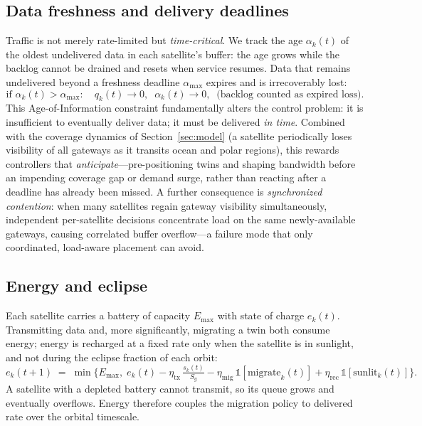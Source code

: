 \documentclass[11pt]{article}
\begin{document}
\subsection{Data freshness and delivery deadlines}
Traffic is not merely rate-limited but \emph{time-critical}. We track the age
$\alpha_k(t)$ of the oldest undelivered data in each satellite's buffer: the age
grows while the backlog cannot be drained and resets when service resumes. Data
that remains undelivered beyond a freshness deadline $\alpha_{\max}$ expires and is
irrecoverably lost:
\begin{equation}
  \text{if } \alpha_k(t) > \alpha_{\max}: \quad
  q_k(t) \rightarrow 0, \;\; \alpha_k(t) \rightarrow 0, \;\;
  \text{(backlog counted as expired loss)}.
  \label{eq:deadline}
\end{equation}
This Age-of-Information constraint fundamentally alters the control problem: it is
insufficient to eventually deliver data; it must be delivered \emph{in time}.
Combined with the coverage dynamics of Section~\ref{sec:model} (a satellite
periodically loses visibility of all gateways as it transits ocean and polar
regions), this rewards controllers that \emph{anticipate}---pre-positioning twins
and shaping bandwidth before an impending coverage gap or demand surge, rather than
reacting after a deadline has already been missed. A further consequence is
\emph{synchronized contention}: when many satellites regain gateway visibility
simultaneously, independent per-satellite decisions concentrate load on the same
newly-available gateways, causing correlated buffer overflow---a failure mode that
only coordinated, load-aware placement can avoid.

\subsection{Energy and eclipse}
Each satellite carries a battery of capacity $E_{\max}$ with state of charge
$e_k(t)$. Transmitting data and, more significantly, migrating a twin both consume
energy; energy is recharged at a fixed rate only when the satellite is in
sunlight, and not during the eclipse fraction of each orbit:
\begin{equation}
  e_k(t{+}1) \;=\; \min\!\Big\{ E_{\max},\;
  e_k(t) - \eta_{\mathrm{tx}}\,\tfrac{s_k(t)}{S_g}
  - \eta_{\mathrm{mig}}\,\mathbb{1}[\text{migrate}_k(t)]
  + \eta_{\mathrm{rec}}\,\mathbb{1}[\text{sunlit}_k(t)] \Big\}.
  \label{eq:energy}
\end{equation}
A satellite with a depleted battery cannot transmit, so its queue grows and
eventually overflows. Energy therefore couples the migration policy to
delivered rate over the orbital timescale.
\end{document}
